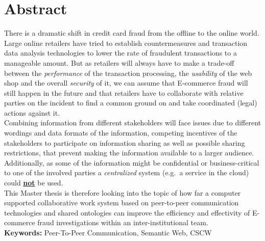 
\chapter*{Abstract}

There is a dramatic shift in credit card fraud from the offline to the online world.
Large online retailers have tried to establish countermeasures and transaction data analysis technologies
to lower the rate of fraudulent transactions to a manageable amount. But as retailers will always have to
make a trade-off between the \textit{performance} of the transaction processing, the \textit{usability} of the web shop
and the overall \textit{security} of it, we can assume that E-commerce fraud will still happen in the future and that
retailers have to collaborate with relative parties on the incident to find a common ground on and take coordinated
(legal) actions against it.
\\[0.8em]
Combining information from different stakeholders will face issues due to different wordings and data formats of the
information, competing incentives of the stakeholders to participate on information sharing as well as possible sharing
restrictions, that prevent making the information available to a larger audience. Additionally, as some of the information
might be confidential or business-critical to one of the involved parties a \textit{centralized} system
(e.g.\ a service in the cloud) could \textbf{\underline{not}} be used.
\\[0.8em]
This Master thesis is therefore looking into the topic of how far a computer supported collaborative work system
based on peer-to-peer communication technologies and shared ontologies can improve the efficiency and effectivity
of E-commerce fraud investigations within an inter-institutional team.
\\[2em]
\textbf{Keywords:} Peer-To-Peer Communication, Semantic Web, CSCW
